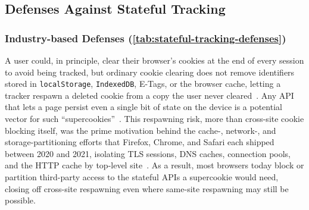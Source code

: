 \subsection{Defenses Against Stateful Tracking}
\label{sec:stateful-defenses}





\subsubsection{Industry-based Defenses (\autoref{tab:stateful-tracking-defenses})}
\label{sec:stateful-defenses-industry}



\label{sec:stateful-defenses-evercookie}
%
A user could, in principle, clear their browser's cookies at the end of every session to avoid being tracked, but ordinary cookie clearing does not remove identifiers stored in \texttt{localStorage}, \texttt{IndexedDB}, E-Tags, or the browser cache, letting a tracker respawn a deleted cookie from a copy the user never cleared~\cite{ayensonFlashCookiesPrivacy2011,acarFPDetectiveDustingWeb2013,sorensenZombiecookiesCaseStudies2013}.
%
Any API that lets a page persist even a single bit of state on the device is a potential vector for such ``supercookies''~\cite{soltaniFlashCookiesPrivacy2009,aliNavigatingMurkyWaters2023,kamkarSamyKamkarEvercookie2010,klink1334485TrackingUsing2017}.
%
This respawning risk, more than cross-site cookie blocking itself, was the prime motivation behind the cache-, network-, and storage-partitioning efforts that Firefox, Chrome, and Safari each shipped between 2020 and 2021, isolating TLS sessions, DNS caches, connection pools, and the HTTP cache by top-level site~\cite{menkeStorageIsolationProject2020,privacycommunitygroupClientSideStoragePartitioning2022,mdnStatePartitioningPrivacy2024}.
%
As a result, most browsers today block or partition third-party access to the stateful APIs a supercookie would need, closing off cross-site respawning even where same-site respawning may still be possible.


